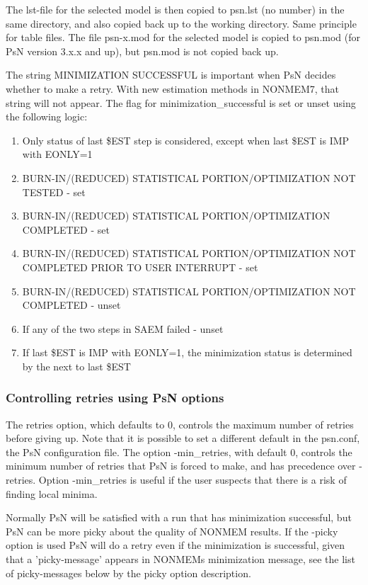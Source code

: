 The lst-file for the selected model is then copied to psn.lst (no number) in the same directory, and also copied back 
up to the working directory. Same principle for table files. The file psn-x.mod for the selected model is copied 
to psn.mod (for PsN version 3.x.x and up), but psn.mod is not copied back up.   	

The string MINIMIZATION SUCCESSFUL is important when PsN decides whether to make a retry. With new estimation 
methods in NONMEM7, that string will not appear. The flag for minimization\_successful is set or unset using the following logic:

\begin{enumerate}
\item Only status of last \$EST step is considered, except when last \$EST is IMP with EONLY=1
\item BURN-IN/(REDUCED) STATISTICAL PORTION/OPTIMIZATION NOT TESTED - set
\item BURN-IN/(REDUCED) STATISTICAL PORTION/OPTIMIZATION COMPLETED -  set
\item BURN-IN/(REDUCED) STATISTICAL PORTION/OPTIMIZATION NOT COMPLETED PRIOR TO USER INTERRUPT - set
\item BURN-IN/(REDUCED) STATISTICAL PORTION/OPTIMIZATION NOT COMPLETED - unset
\item If any of the two steps in SAEM failed - unset 
\item If last \$EST is IMP with EONLY=1, the minimization status is determined by the next to last \$EST
\end{enumerate}

\subsubsection{Controlling retries using PsN options}
The retries option, which defaults to 0, controls the maximum number of retries before giving up. Note that it is 
possible to set a different default in the psn.conf, the PsN configuration file. The option -min\_retries, 
with default 0, controls the minimum number of retries that PsN is forced to make, and has precedence over -retries. 
Option -min\_retries is useful if the user suspects that there is a risk of finding local minima.

Normally PsN will be satisfied with a run that has minimization successful, but PsN can be more picky about the 
quality of NONMEM results. If the -picky option is used PsN will do a retry even if the minimization is successful, 
given that a 'picky-message' appears in NONMEMs minimization message, see the list of picky-messages below by the picky option description.


